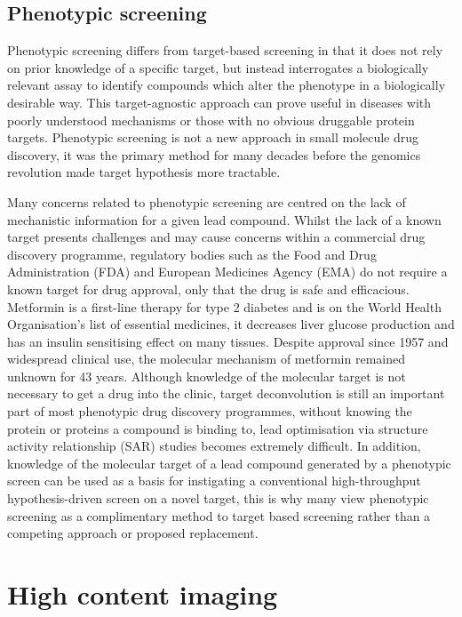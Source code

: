 \documentclass[a4paper,11pt,twoside,openright]{scrbook}
\begin{document}
\subsection{Phenotypic screening}

Phenotypic screening differs from target-based screening in that it does not rely on prior knowledge of a specific 
target, but instead interrogates a biologically relevant assay to identify compounds which alter the phenotype in a 
biologically desirable way.
This target-agnostic approach can prove useful in diseases with poorly understood mechanisms or those with no obvious 
druggable protein targets.
Phenotypic screening is not a new approach in small molecule drug discovery, it was the primary method for many decades 
before the genomics revolution made target hypothesis more tractable.
\cite{Zheng2013}

Many concerns related to phenotypic screening are centred on the lack of mechanistic information for a given lead 
compound.
Whilst the lack of a known target presents challenges and may cause concerns within a commercial drug discovery 
programme, regulatory bodies such as the Food and Drug Administration (FDA) and European Medicines Agency (EMA) do not 
require a known target for drug approval, only that the drug is safe and efficacious.
Metformin is a first-line therapy for type 2 diabetes and is on the World Health Organisation's list of essential 
medicines, it decreases liver glucose production and has an insulin sensitising effect on many tissues.
Despite approval since 1957 and widespread clinical use, the  molecular mechanism of metformin remained unknown for 43 
years. \cite{Hundal2000}
Although knowledge of the molecular target is not necessary to get a drug into the clinic, target deconvolution is 
still an important part of most phenotypic drug discovery programmes, without knowing the protein or proteins a 
compound is binding to, lead optimisation via structure activity relationship (SAR) studies becomes extremely difficult.
In addition, knowledge of the molecular target of a lead compound generated by a phenotypic screen can be used as a 
basis for instigating a conventional high-throughput hypothesis-driven screen on a novel target, this is why many view 
phenotypic screening as a complimentary method to target based screening rather than a competing approach or proposed 
replacement. \cite{Moffat2014}


\section{High content imaging}
\end{document}

